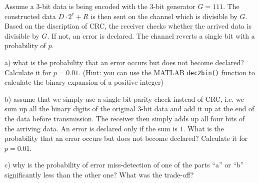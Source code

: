 \documentclass[10pt,letterpaper]{article}
\begin{document}
Assume a 3-bit data is being encoded with the 3-bit generator $G=111$. The constructed data $D\cdot 2^r+R$ is then sent on the channel which is divisible by $G$. Based on the discription of CRC, the receiver checks whether the arrived data is divisible by $G$. If not, an error is declared. The channel reverts a single bit with a probability of $p$.

a) what is the probability that an error occurs but does not become declared? Calculate it for $p=0.01$. (Hint: you can use the MATLAB \texttt{dec2bin()} function to calculate the binary expansion of a positive integer)

b) assume that we simply use a single-bit parity check instead of CRC, i.e. we sum up all the binary digits of the original $3$-bit data and add it up at the end of the data before transmission. The receiver then simply adds up all four bits of the arriving data. An error is declared only if the sum is $1$. What is the probability that an error occurs but does not become declared? Calculate it for $p=0.01$.

c) why is the probability of error miss-detection of one of the parts ``a'' or ``b'' significantly less than the other one? What was the trade-off?
\end{document}
